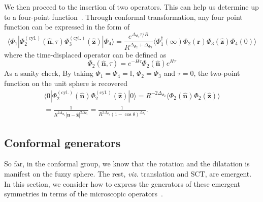 \documentclass{timesjhep}
\begin{document}
We then proceed to the insertion of two operators. This can help us determine up to a four-point function~\cite{Han2023Jun}. Through conformal transformation, any four point function can be expressed in the form of 
\begin{equation}
    \langle\Phi_1|\Phi^{\mathrm{(cyl.)}}_2(\hat{\mathbf{n}},\tau)\Phi^{\mathrm{(cyl.)}}_3(\hat{\mathbf{z}})|\Phi_4\rangle=\frac{e^{\Delta_{\Phi_2}\tau/R}}{R^{\Delta_{\Phi_2}+\Delta_{\Phi_3}}}\langle\Phi_1^\dagger(\infty)\Phi_2(\mathbf{r})\Phi_3(\hat{\mathbf{z}})\Phi_4(0)\rangle
\end{equation} where the time-displaced operator can be defined as
\begin{equation}
    \Phi_2(\hat{\mathbf{n}},\tau)=e^{-H\tau}\Phi_2(\hat{\mathbf{n}})e^{H\tau}
\end{equation} As a sanity check, By taking $\Phi_1=\Phi_4=\mathbb{I}$, $\Phi_2=\Phi_3$ and $\tau=0$, the two-point function on the unit sphere is recovered 
\begin{multline}
    \langle0|\Phi^{\mathrm{(cyl.)}}_2(\hat{\mathbf{n}})\Phi^{\mathrm{(cyl.)}}_2(\hat{\mathbf{z}})|0\rangle=R^{-2\Delta_{\Phi_2}}\langle\Phi_2(\hat{\mathbf{n}})\Phi_2(\hat{\mathbf{z}})\rangle\\=\frac{1}{R^{2\Delta_{\Phi_2}}|\hat{\mathbf{n}}-\hat{\mathbf{z}}|^{2\Delta_{\Phi_2}}}=\frac{1}{R^{2\Delta_{\Phi_2}}(1-\cos\theta)^{\Delta_{\Phi_2}}}.
\end{multline}

\subsection{Conformal generators}
\label{sec:construct_gen}

So far, in the conformal group, we know that the rotation and the dilatation is manifest on the fuzzy sphere. The rest, \textit{viz.} translation and SCT, are emergent. In this section, we consider how to express the generators of these emergent symmetries in terms of the microscopic operators~\cite{Fardelli2024,Fan2024}. 
\end{document}
